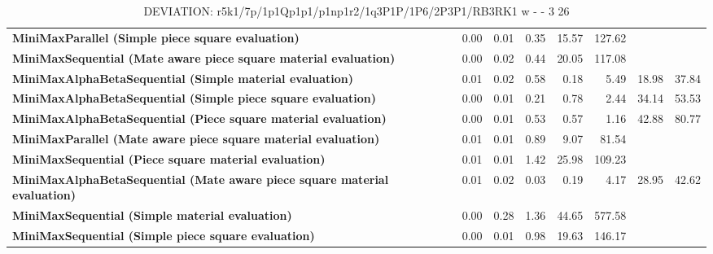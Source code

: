 \begin{table}[H]
{\begin{tabular}{|p{8cm}|*{7}{r|}}
\rowcolor[HTML]{FFFFFF}
\textbf{MiniMaxParallel (Simple piece square evaluation)}               & 0.00 & 0.01 & 0.35 & 15.57 & 127.62 &  &  \\

\rowcolor[HTML]{EFEFEF}
\textbf{MiniMaxSequential (Mate aware piece square material evaluation)}               & 0.00 & 0.02 & 0.44 & 20.05 & 117.08 &  &  \\

\rowcolor[HTML]{FFFFFF}
\textbf{MiniMaxAlphaBetaSequential (Simple material evaluation)}               & 0.01 & 0.02 & 0.58 & 0.18 & 5.49 & 18.98 & 37.84 \\

\rowcolor[HTML]{EFEFEF}
\textbf{MiniMaxAlphaBetaSequential (Simple piece square evaluation)}               & 0.00 & 0.01 & 0.21 & 0.78 & 2.44 & 34.14 & 53.53 \\

\rowcolor[HTML]{FFFFFF}
\textbf{MiniMaxAlphaBetaSequential (Piece square material evaluation)}               & 0.00 & 0.01 & 0.53 & 0.57 & 1.16 & 42.88 & 80.77 \\

\rowcolor[HTML]{EFEFEF}
\textbf{MiniMaxParallel (Mate aware piece square material evaluation)}               & 0.01 & 0.01 & 0.89 & 9.07 & 81.54 &  &  \\

\rowcolor[HTML]{FFFFFF}
\textbf{MiniMaxSequential (Piece square material evaluation)}               & 0.01 & 0.01 & 1.42 & 25.98 & 109.23 &  &  \\

\rowcolor[HTML]{EFEFEF}
\textbf{MiniMaxAlphaBetaSequential (Mate aware piece square material evaluation)}               & 0.01 & 0.02 & 0.03 & 0.19 & 4.17 & 28.95 & 42.62 \\

\rowcolor[HTML]{FFFFFF}
\textbf{MiniMaxSequential (Simple material evaluation)}               & 0.00 & 0.28 & 1.36 & 44.65 & 577.58 &  &  \\

\rowcolor[HTML]{EFEFEF}
\textbf{MiniMaxSequential (Simple piece square evaluation)}               & 0.00 & 0.01 & 0.98 & 19.63 & 146.17 &  &  \\

            \hline
        \end{tabular}%
    }
    \caption{DEVIATION: r5k1/7p/1p1Qp1p1/p1np1r2/1q3P1P/1P6/2P3P1/RB3RK1 w - - 3 26}
    \label{tab:mid-game---discovery---short-deviation}
\end{table}
